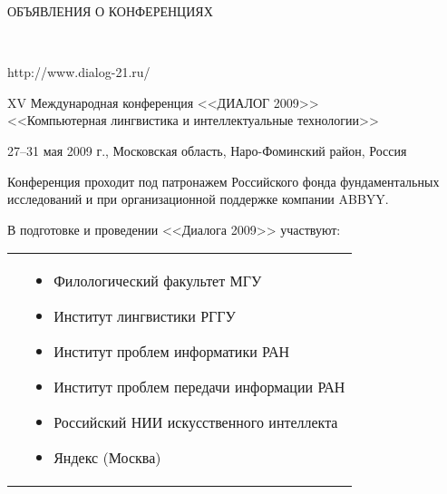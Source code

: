 \documentclass[10pt]{book}
\begin{document}
\Rus

\nwt

\begin{center}

{\prgsh\LARGE
ОБЪЯВЛЕНИЯ О КОНФЕРЕНЦИЯХ}

\end{center}

\vspace*{24pt}
\begin{center}
\mbox{%
\epsfxsize=167mm
}
\end{center}
\begin{flushright}
{\prg http://www.dialog-21.ru/ }
\end{flushright}

\vspace*{6pt}

{\begin{center}\prg
\Large
XV Международная конференция <<ДИАЛОГ 2009>>\\
<<Компьютерная лингвистика и интеллектуальные технологии>>
\end{center}}

{\begin{center}\prg
27--31 мая 2009 г., Московская область, Наро-Фоминский район, Россия
\end{center}}

Конференция проходит под патронажем Российского фонда фундаментальных
исследований и при организационной поддержке компании ABBYY.
\vspace*{6pt}

В подготовке и проведении <<Диалога 2009>> участвуют:
\vspace*{-6pt}

\noindent
\begin{tabular}{p{7mm}p{420pt}}
\hspace*{7mm}
&\begin{itemize}
\item Филологический факультет МГУ
\item Институт лингвистики РГГУ
\item Институт проблем информатики РАН
\item Институт проблем передачи информации РАН
\item Российский НИИ искусственного интеллекта
\item Яндекс (Москва)
\end{itemize}
\end{tabular}
\end{document}
